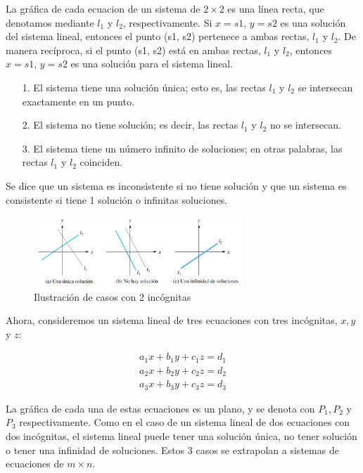 \documentclass{article}
\begin{document}
La gráfica de cada ecuacion de un sistema de $2 \times 2$ es una línea recta, que denotamos mediante $l_1$ y $l_2$, respectivamente. Si $x = s1$, $y = s2$ es una solución del sistema lineal, entonces el punto (s1, s2) pertenece a ambas rectas, $l_1$ y $l_2$. De manera recíproca, si el punto (s1, s2) está en ambas rectas, $l_1$ y $l_2$, entonces $x = s1$, $y = s2$ es una solución para el sistema lineal.

\begin{tcolorbox}[colback=blue!10!white,colframe=blue!60!black,title=Posibles casos]
    \begin{itemize}
        \item[1.] El sistema tiene una solución única; esto es, las rectas $l_1$ y $l_2$ se intersecan exactamente en un punto.
        \item[2.] El sistema no tiene solución; es decir, las rectas $l_1$ y $l_2$ no se intersecan.
        \item[3.] El sistema tiene un número infinito de soluciones; en otras palabras, las rectas $l_1$ y $l_2$ coinciden.
    \end{itemize}
\end{tcolorbox}

Se dice que un sistema es inconsistente si no tiene solución y que un sistema es consistente si tiene 1 solución o infinitas soluciones.

\begin{figure}[ht]
  \centerline{\includegraphics[width=0.7\textwidth]{image5.png}}
  \caption{Ilustración de casos con 2 incógnitas}
  \label{}
\end{figure}

Ahora, consideremos un sistema lineal de tres ecuaciones con tres incógnitas, $x, y$ y $z$:

$$\begin{matrix}
    a_1x + b_1y + c_1z =d_1\\ 
    a_2x + b_2y + c_2z =d_2\\ 
    a_3x + b_3y + c_3z =d_3
\end{matrix}$$

La gráfica de cada una de estas ecuaciones es un plano, y se denota con $P_1, P_2$ y $P_3$ respectivamente. Como en el caso de un sistema lineal de dos ecuaciones con dos incógnitas, el sistema lineal puede tener una solución única, no tener solución o tener una infinidad de soluciones. Estos 3 casos se extrapolan a sistemas de ecuaciones de $m \times n$.
\end{document}
